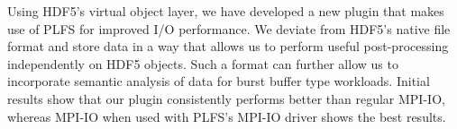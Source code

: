 Using HDF5's virtual object layer, we have developed a new plugin that makes use of PLFS for improved I/O performance. We deviate from HDF5's native file format and store data in a way that allows us to perform useful post-processing independently on HDF5 objects. 
Such a format can further allow us to incorporate semantic analysis of data for burst buffer type workloads. 
Initial results show that our plugin consistently performs better than regular MPI-IO, whereas MPI-IO when used with PLFS's MPI-IO driver shows the best results. 


